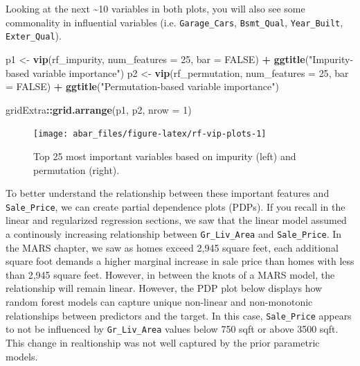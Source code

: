 \documentclass[]{book}
\newenvironment{Shaded}{\begin{snugshade}}{\end{snugshade}}
\newcommand{\DataTypeTok}[1]{\textcolor[rgb]{0.13,0.29,0.53}{#1}}
\newcommand{\DecValTok}[1]{\textcolor[rgb]{0.00,0.00,0.81}{#1}}
\newcommand{\KeywordTok}[1]{\textcolor[rgb]{0.13,0.29,0.53}{\textbf{#1}}}
\newcommand{\NormalTok}[1]{#1}
\newcommand{\OperatorTok}[1]{\textcolor[rgb]{0.81,0.36,0.00}{\textbf{#1}}}
\newcommand{\OtherTok}[1]{\textcolor[rgb]{0.56,0.35,0.01}{#1}}
\newcommand{\StringTok}[1]{\textcolor[rgb]{0.31,0.60,0.02}{#1}}
\theoremstyle{definition}
\theoremstyle{definition}
\theoremstyle{definition}
\theoremstyle{remark}
\begin{document}
Looking at the next \textasciitilde{}10 variables in both plots, you
will also see some commonality in influential variables (i.e.
\texttt{Garage\_Cars}, \texttt{Bsmt\_Qual}, \texttt{Year\_Built},
\texttt{Exter\_Qual}).

\begin{Shaded}
\begin{Highlighting}[]
\NormalTok{p1 <-}\StringTok{ }\KeywordTok{vip}\NormalTok{(rf_impurity, }\DataTypeTok{num_features =} \DecValTok{25}\NormalTok{, }\DataTypeTok{bar =} \OtherTok{FALSE}\NormalTok{) }\OperatorTok{+}\StringTok{ }\KeywordTok{ggtitle}\NormalTok{(}\StringTok{"Impurity-based variable importance"}\NormalTok{)}
\NormalTok{p2 <-}\StringTok{ }\KeywordTok{vip}\NormalTok{(rf_permutation, }\DataTypeTok{num_features =} \DecValTok{25}\NormalTok{, }\DataTypeTok{bar =} \OtherTok{FALSE}\NormalTok{) }\OperatorTok{+}\StringTok{ }\KeywordTok{ggtitle}\NormalTok{(}\StringTok{"Permutation-based variable importance"}\NormalTok{)}

\NormalTok{gridExtra}\OperatorTok{::}\KeywordTok{grid.arrange}\NormalTok{(p1, p2, }\DataTypeTok{nrow =} \DecValTok{1}\NormalTok{)}
\end{Highlighting}
\end{Shaded}

\begin{figure}

{\centering \texttt{[image: abar\_files/figure-latex/rf-vip-plots-1]} 

}

\caption{Top 25 most important variables based on impurity (left) and permutation (right).}\label{fig:rf-vip-plots}
\end{figure}

To better understand the relationship between these important features
and \texttt{Sale\_Price}, we can create partial dependence plots (PDPs).
If you recall in the linear and regularized regression sections, we saw
that the linear model assumed a continously increasing relationship
between \texttt{Gr\_Liv\_Area} and \texttt{Sale\_Price}. In the MARS
chapter, we saw as homes exceed 2,945 square feet, each additional
square foot demands a higher marginal increase in sale price than homes
with less than 2,945 square feet. However, in between the knots of a
MARS model, the relationship will remain linear. However, the PDP plot
below displays how random forest models can capture unique non-linear
and non-monotonic relationships between predictors and the target. In
this case, \texttt{Sale\_Price} appears to not be influenced by
\texttt{Gr\_Liv\_Area} values below 750 sqft or above 3500 sqft. This
change in realtionship was not well captured by the prior parametric
models.
\end{document}

